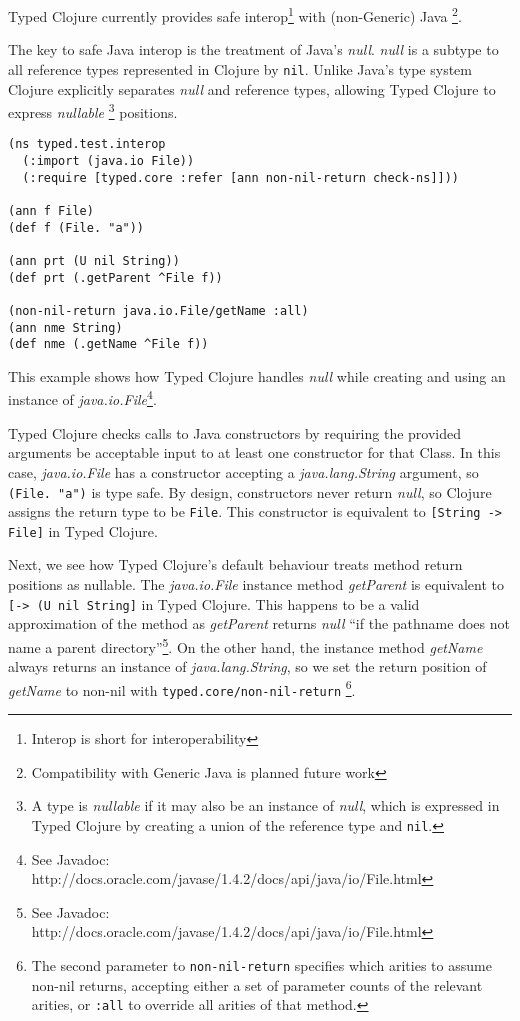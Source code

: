 \documentclass{cshonours}
\begin{document}
Typed Clojure currently provides safe interop\footnote{Interop is short for interoperability} with (non-Generic) Java
\footnote{Compatibility with Generic Java is planned future work}.

The key to safe Java interop is the treatment of Java's \emph{null}.
\emph{null} is a subtype to all reference types
represented in Clojure by \lstinline|nil|. Unlike Java's type system
Clojure explicitly separates \emph{null} and reference types, allowing
Typed Clojure to express
\emph{nullable}
\footnote{A type is \emph{nullable} if it may also be an instance of \emph{null},
which is expressed in Typed Clojure by creating a union of the reference type and \lstinline|nil|.}
positions.

\begin{lstlisting}
(ns typed.test.interop
  (:import (java.io File))
  (:require [typed.core :refer [ann non-nil-return check-ns]]))

(ann f File)
(def f (File. "a"))

(ann prt (U nil String))
(def prt (.getParent ^File f))

(non-nil-return java.io.File/getName :all)
(ann nme String)
(def nme (.getName ^File f))

\end{lstlisting}

This example shows how Typed Clojure handles \emph{null} while creating and
using an instance of \emph{java.io.File}\footnote{See Javadoc: http://docs.oracle.com/javase/1.4.2/docs/api/java/io/File.html}.

Typed Clojure checks calls to Java constructors by requiring the provided
arguments be acceptable input to at least one constructor for that Class.
In this case, \emph{java.io.File} has a constructor accepting a \emph{java.lang.String}
argument, so \lstinline|(File. "a")| is type safe. By design, constructors never
return \emph{null}, so Clojure assigns the return type to be \lstinline|File|.
This constructor is equivalent to \lstinline|[String -> File]| in Typed Clojure.

Next, we see how Typed Clojure's default behaviour treats method return positions as nullable.
The \emph{java.io.File} instance method \emph{getParent}
is equivalent to \lstinline|[-> (U nil String]| in Typed Clojure. This happens to be
a valid approximation of the method as \emph{getParent} returns \emph{null} 
``if the pathname does not name a parent directory''\footnote{See Javadoc: http://docs.oracle.com/javase/1.4.2/docs/api/java/io/File.html}.
On the other hand, the instance method \emph{getName} always returns an
instance of \emph{java.lang.String}, so we set the return position of
\emph{getName} to non-nil with \lstinline|typed.core/non-nil-return|
\footnote{The second parameter to \lstinline|non-nil-return| specifies which arities to assume non-nil 
returns, accepting either a set of parameter counts of the relevant arities, or \lstinline|:all|
to override all arities of that method.}.
\end{document}
